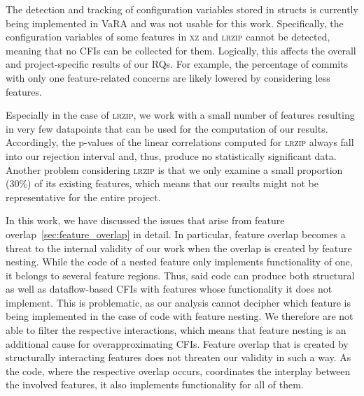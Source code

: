 The detection and tracking of configuration variables stored in structs is currently being implemented in VaRA and was not usable for this work.  
Specifically, the configuration variables of some features in \textsc{xz} and \textsc{lrzip} cannot be detected, meaning that no CFIs can be collected for them. 
Logically, this affects the overall and project-specific results of our RQs.
For example, the percentage of commits with only one feature-related concerns are likely lowered by considering less features. 

Especially in the case of \textsc{lrzip}, we work with a small number of features resulting in very few datapoints that can be used for the computation of our results.
Accordingly, the p-values of the linear correlations computed for \textsc{lrzip} always fall into our rejection interval and, thus, produce no statistically significant data.
Another problem considering \textsc{lrzip} is that we only examine a small proportion (30\%) of its existing features, which means that our results might not be representative for the entire project. 

In this work, we have discussed the issues that arise from feature overlap~\ref{sec:feature_overlap} in detail.
In particular, feature overlap becomes a threat to the internal validity of our work when the overlap is created by feature nesting.
While the code of a nested feature only implements functionality of one, it belongs to several feature regions.
Thus, said code can produce both structural as well as dataflow-based CFIs with features whose functionality it does not implement.
This is problematic, as our analysis cannot decipher which feature is being implemented in the case of code with feature nesting.
We therefore are not able to filter the respective interactions, which means that feature nesting is an additional cause for overapproximating CFIs. %
Feature overlap that is created by structurally interacting features does not threaten our validity in such a way.
As the code, where the respective overlap occurs, coordinates the interplay between the involved features, it also implements functionality for all of them. \\

